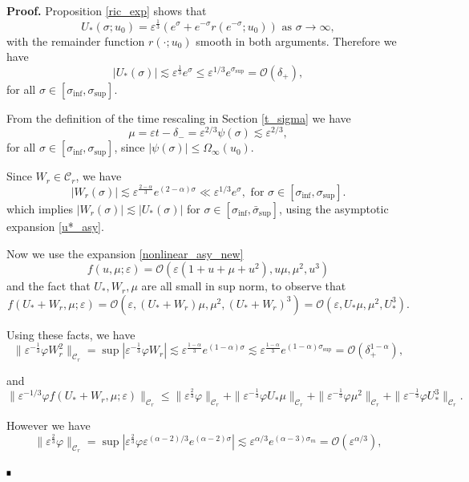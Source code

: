 \documentclass[letterpaper,11pt]{article}
\newcommand{\rmO}{\mathcal{O}}
\newcommand{\eps}{\varepsilon}
\newcommand{\lar}{ \lesssim }
\numberwithin{equation}{section}
\theoremstyle{plain}
\newenvironment{Proof}[1][.]%
 {\begin{trivlist}\item[]\textbf{Proof#1 }}%
 {\hspace*{\fill}$\rule{0.3\baselineskip}{0.35\baselineskip}$\end{trivlist}}
\begin{document}
\begin{Proof} Proposition \ref{ric_exp} shows that
\begin{equation} \label{u*_asy}
U_*(\sigma;u_0) =  \eps^{\frac{1}{3}}(e^\sigma+e^{-\sigma} r(e^{-\sigma}; u_0)   ) \text{ as }\sigma \to \infty,
\end{equation}
with the remainder function $r(\cdot;u_0)$ smooth in both arguments.
Therefore we have
\[
|U_*(\sigma)| \lar \eps^{\frac{1}{3}}e^\sigma \le \eps^{1/3}e^{\sigma_{\sup}} = \rmO(\delta_+),
\]
for all $\sigma \in [\sigma_{\inf},\sigma_{\sup}]$.

From the definition of the time rescaling in Section \ref{t_sigma} we have
\[
\mu = \eps t-\delta_-  =\eps^{2/3}\psi(\sigma) \lar \eps^{2/3},
\]
for all $\sigma \in [\sigma_{\inf},\sigma_{\sup}]$, since $|\psi(\sigma)| \le \Omega_\infty(u_0)$.

Since $W_r \in \mathcal{C}_r$, we have 
\[
|W_r(\sigma)| \lar \eps^{\frac{2-\alpha}{3}} e^{(2-\alpha)\sigma} \ll \eps^{1/3}e^\sigma, \text{ for } \sigma \in [\sigma_{\inf}, \sigma_{\sup}].
\]
which implies $|W_r(\sigma)| \lar |U_*(\sigma)|$ for $\sigma \in [\sigma_{\inf}, \bar{\sigma}_{\sup}]$, using the asymptotic expansion \eqref{u*_asy}.

Now we use the expansion \eqref{nonlinear_asy_new}
\[
f(u,\mu; \eps) = \rmO(\eps(1+u+\mu+u^2),u\mu,\mu^2,u^3)
\] 
and the fact that $U_*,W_r,\mu$ are all small in sup norm, to observe that
\begin{equation}\label{nonlinear_asy:fr}
f(U_*+W_r, \mu ;\eps) = \rmO(\eps, (U_*+W_r)\mu, \mu^2, (U_*+W_r)^3 ) = \rmO(\eps, U_*\mu, \mu^2, U_*^3).
\end{equation}

Using these facts, we have
\begin{equation}\label{nl_est:Rr_1}
\|\eps^{-\frac{1}{3}}\varphi W_r^2\|_{\mathcal{C}_r}=\sup |\eps^{-\frac{1}{3}} \varphi W_r| \lar \eps^{\frac{1-\alpha}{3}} e^{(1-\alpha)\sigma} \lar \eps^{\frac{1-\alpha}{3}} e^{(1-\alpha)\sigma_{\sup}} =  \rmO(\delta^{1-\alpha}_+),
\end{equation}

and
\[
\|\eps^{-1/3}\varphi f(U_*+W_r, \mu ;\eps)\|_{\mathcal{C}_r} \le \|\eps^{\frac{2}{3}}\varphi  \|_{\mathcal{C}_r}+\|\eps^{-\frac{1}{3}}\varphi U_*\mu \|_{\mathcal{C}_r}+\|\eps^{-\frac{1}{3}}\varphi \mu^2 \|_{\mathcal{C}_r}+\|\eps^{-\frac{1}{3}}\varphi U_*^3\|_{\mathcal{C}_r}.
\]

However we have
\[
\|\eps^{\frac{2}{3}}\varphi \|_{\mathcal{C}_r}=\sup |\eps^{\frac{2}{3}} \varphi   \eps^{(\alpha-2)/3}e^{(\alpha-2)\sigma}| \lar \eps^{\alpha/3} e^{(\alpha-3)\sigma_m} = \rmO(\eps^{\alpha/3}) ,
\]


\end{Proof}
\end{document}
